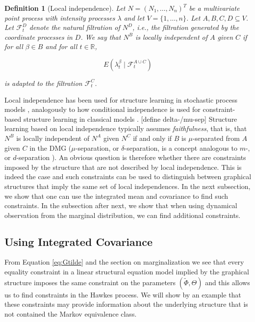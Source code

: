 \documentclass[accepted]{uai2021} %
\newtheorem{defn}[thm]{Definition}
\begin{document}
\begin{defn}[Local independence]
	Let $N = (N_1,\ldots,N_n)^T$ be a multivariate point process with intensity 
	processes $\lambda$ and let $V=\{1,\ldots,n\}$. Let $A,B,C,D \subseteq V$. 
	Let $\mathcal{F}_t^D$ denote the natural filtration of $N^D$, i.e., the 
	filtration generated by the coordinate processes in $D$. We say that $N^B$ 
	is \emph{locally independent of $A$ given $C$} if for all $\beta\in B$ and 
	for all $t\in \mathbb{R}$,
	
	$$
	E(\lambda_t^\beta \mid \mathcal{F}_t^{A\cup C})
	$$
	
	is adapted to the filtration $\mathcal{F}_t^C$.
	\label{def:li}
\end{defn}

Local independence has been used for structure learning in stochastic process 
models 
\citep{meek2014, mogensenUAI2018, thams2019, mogensenUAI2020}, analogously to 
how conditional independence is used for 
constraint-based structure learning in classical models \citep{spirtes1993, 
spirtesSearchChapHandbook}. 
[define 
delta-/mu-sep] Structure learning based on local independence typically assumes 
\emph{faithfulness}, that is, that $N^B$ is locally independent of $N^A$ given 
$N^C$ if and only if $B$ is $\mu$-separated from $A$ given $C$ in the DMG 
($\mu$-separation, or $\delta$-separation, is a concept analogous to $m$-, or 
$d$-separation \citep{didelez2000, didelez2008, mogensen2018}). An obvious 
question is therefore whether there are constraints imposed by the 
 structure that are not described by local independence. This is indeed the 
 case 
 and such constraints can be used to distinguish between graphical structures 
 that imply the same set of local independences. In the next subsection, we 
 show that one can use the integrated mean and covariance to find such 
 constraints. In the subsection after next, we show that when using
 dynamical observation from the marginal distribution, we can find additional 
 constraints.



\subsection{Using Integrated Covariance}

From Equation \ref{eq:Gtilde} and the section on marginalization we see that 
every equality 
constraint in a linear structural equation model implied by the graphical 
structure imposes the same constraint
on the parameters $(\tilde{\Phi}, \Theta)$ and this allows us to find 
constraints 
in the Hawkes process. We will show by an example that these constraints may 
provide information about the underlying structure that is not contained the 
Markov equivalence class.
\end{document}
